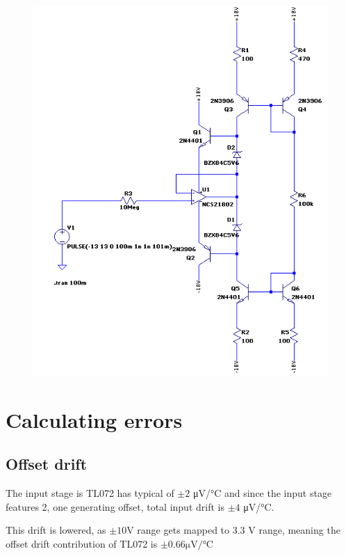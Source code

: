 \documentclass[11pt]{article}
\begin{document}
\begin{figure}[H]
  \centering 
  \includegraphics[scale=0.55]{"./figs/bootstrap.png"}
\end{figure}


\section{Calculating errors}

\subsection{Offset drift}

The input stage is TL072 has typical of $\pm 2$ \si{\micro \volt / \celsius} and 
since the input stage features 2, one generating offset, total input 
drift is $\pm 4$ \si{\micro \volt / \celsius}. 

This drift is lowered, as $\pm 10 \si{\volt}$ range gets mapped to 3.3 \si{\volt}
range, meaning the offset drift contribution of TL072 is 
$\pm0.66  \si{\micro \volt / \celsius}$
\end{document}
